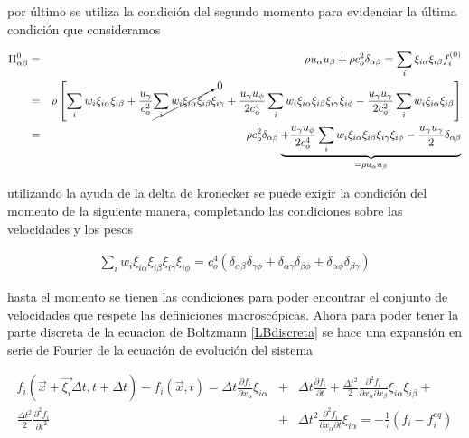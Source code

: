 \noindent por último se utiliza la condición del segundo momento para evidenciar la última condición que consideramos 

\begin{eqnarray}
\Pi_{\alpha\beta}^{0}&=&\rho u_{\alpha}u_{\beta}+\rho c_{o}^{2}\delta_{\alpha\beta}=\sum_{i}\xi_{i\alpha}\xi_{i\beta}f_{i}^{(0)}\nonumber\\
&=&\rho\left[\sum_{i}w_{i}\xi_{i\alpha}\xi_{i\beta} + \frac{u_{\gamma}}{c_{o}^{2}}\cancelto{0}{\sum_{i}w_{i}\xi_{i\alpha}\xi_{i\beta}}\xi_{i\gamma}+\frac{u_{\gamma}u_{\phi}}{2c_{o}^{4}}\sum_{i}w_{i}\xi_{i\alpha}\xi_{i\beta}\xi_{i\gamma}\xi_{i\phi}-\frac{u_{\gamma}u_{\gamma}}{2c_{o}^{2}}\sum_{i}w_{i}\xi_{i\alpha}\xi_{i\beta}\right]\nonumber\\
&=&\rho c_{o}^{2}\delta_{\alpha\beta}\underbrace{+\frac{u_{\gamma}u_{\phi}}{2c_{o}^{4}}\sum_{i}w_{i}\xi_{i\alpha}\xi_{i\beta}\xi_{i\gamma}\xi_{i\phi}-\frac{u_{\gamma}u_{\gamma}}{2}\delta_{\alpha\beta}}_{=\rho u_{\alpha}u_{\beta}}
\end{eqnarray}

\noindent utilizando la ayuda de la delta de kronecker se puede exigir la condición del momento de la siguiente manera, completando las condiciones sobre las velocidades y los pesos

\begin{eqnarray}
\sum_{i}w_{i}\xi_{i\alpha}\xi_{i\beta}\xi_{i\gamma}\xi_{i\phi} = c_{o}^{4}(\delta_{\alpha\beta}\delta_{\gamma\phi}+\delta_{\alpha\gamma}\delta_{\beta\phi}+\delta_{\alpha\phi}\delta_{\beta\gamma})
\end{eqnarray}

\noindent hasta el momento se tienen las condiciones para poder encontrar el conjunto de velocidades que respete las definiciones macroscópicas. Ahora para poder tener la parte discreta de la ecuacion de Boltzmann \eqref{LBdiscreta} se hace una expansión en serie de Fourier de la ecuación de evolución del sistema 

\begin{eqnarray}
\label{expansion}
f_{i}(\vec{x}+\vec{\xi_{i}}\Delta t, t + \Delta t)-f_{i}(\vec{x},t) = \Delta t \frac{\partial f_{i}}{\partial x_{\alpha}}\xi_{i\alpha} &+& \Delta t \frac{\partial f_{i}}{\partial t} + \frac{\Delta t^{2}}{2}\frac{\partial^{2}f_{i}}{\partial x_{\alpha} \partial x_{\beta}}\xi_{i\alpha}\xi_{i\beta}+\nonumber\\\frac{\Delta t^{2}}{2}\frac{\partial^{2}f_{i}}{\partial t^{2}}
&+& \Delta t^{2} \frac{\partial^{2}f_{i}}{\partial x_{\alpha}\partial t}\xi_{i\alpha} = -\frac{1}{\tau}(f_{i}-f^{eq}_{i})
\end{eqnarray}

